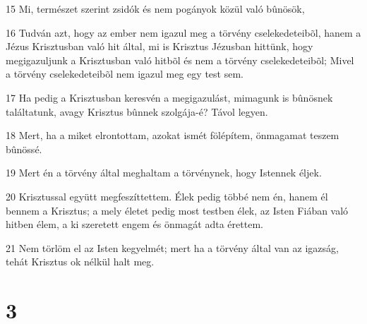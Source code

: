 \par 15 Mi, természet szerint zsidók és nem pogányok közül való bûnösök,
\par 16 Tudván azt, hogy az ember nem igazul meg a törvény cselekedeteibõl, hanem a Jézus Krisztusban való hit által, mi is Krisztus Jézusban hittünk, hogy megigazuljunk a Krisztusban való hitbõl és nem a törvény cselekedeteibõl; Mivel a törvény cselekedeteibõl nem igazul meg egy test sem.
\par 17 Ha pedig a Krisztusban keresvén a megigazulást, mimagunk is bûnösnek találtatunk, avagy Krisztus bûnnek szolgája-é? Távol legyen.
\par 18 Mert, ha a miket elrontottam, azokat ismét fölépítem, önmagamat teszem bûnössé.
\par 19 Mert én a törvény által meghaltam a törvénynek, hogy Istennek éljek.
\par 20 Krisztussal együtt megfeszíttettem. Élek pedig többé nem én, hanem él bennem a Krisztus; a mely életet pedig most testben élek, az Isten Fiában való hitben élem, a ki szeretett engem és önmagát adta érettem.
\par 21 Nem törlöm el az Isten kegyelmét; mert ha a törvény által van az igazság, tehát Krisztus ok nélkül halt meg.

\chapter{3}

